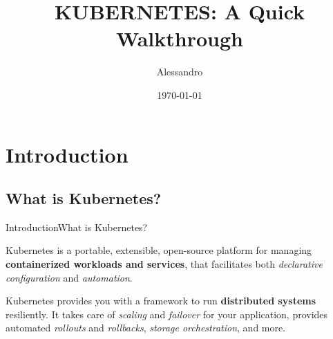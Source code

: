 \documentclass[10pt,aspectratio=169
	]{beamer}
\title[Kubernetes Overview] %
	{KUBERNETES: A Quick Walkthrough} %
\date{\today}
\author[Alessandro]%
	{%
		Alessandro
	}
\institute[
		Faculty of Computer Science\\
		Free University of Bolzano\\
		Italy
	]
	{%
		Free University of Bolzano
	}
\begin{document}
	\maketitle

	\section{Introduction}
		\subsection{What is Kubernetes?}
		\begin{frame}{Introduction}{What is Kubernetes?}
				\begin{block}{}
					Kubernetes is a portable, extensible, open-source platform for managing \textbf{containerized workloads and services}, that facilitates both \textit{declarative configuration} and \textit{automation}.\vspace{1em}
					\pause

					Kubernetes provides you with a framework to run \textbf{distributed systems} resiliently. It takes care of \textit{scaling} and \textit{failover} for your application, provides automated \textit{rollouts} and \textit{rollbacks}, \textit{storage orchestration}, and more. \autocite{kube_def}
				\end{block}
		\end{frame}
\end{document}
